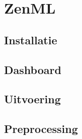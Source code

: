 \section{ZenML}
\subsection{Installatie}
\subsection{Dashboard}
\subsection{Uitvoering}
\subsection{Preprocessing}
